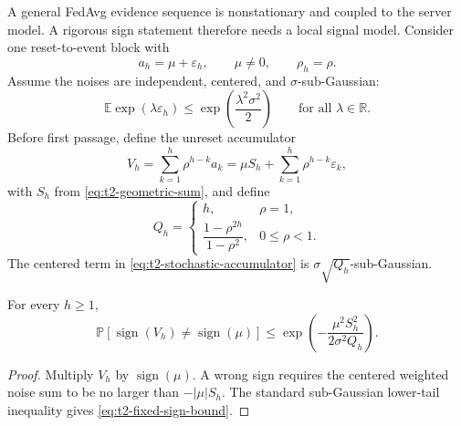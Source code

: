 A general FedAvg evidence sequence is nonstationary and coupled to the server model. A rigorous sign statement therefore needs a local signal model. Consider one reset-to-event block with
\begin{equation}
    a_h=\mu+\varepsilon_h,
    \qquad
    \mu\neq0,
    \qquad
    \rho_h=\rho.
    \label{eq:t2-signal-noise}
\end{equation}
Assume the noises are independent, centered, and $\sigma$-sub-Gaussian:
\begin{equation}
    \mathbb{E}\exp(\lambda\varepsilon_h)
    \leq
    \exp\left(\frac{\lambda^2\sigma^2}{2}\right)
    \qquad
    \text{for all }\lambda\in\mathbb{R}.
    \label{eq:t2-subgaussian}
\end{equation}
Before first passage, define the unreset accumulator
\begin{equation}
    V_h
    =
    \sum_{k=1}^{h}\rho^{h-k}a_k
    =
    \mu S_h+
    \sum_{k=1}^{h}\rho^{h-k}\varepsilon_k,
    \label{eq:t2-stochastic-accumulator}
\end{equation}
with $S_h$ from \eqref{eq:t2-geometric-sum}, and define
\begin{equation}
    Q_h=
    \begin{cases}
        h, & \rho=1,\\[1mm]
        \dfrac{1-\rho^{2h}}{1-\rho^2}, & 0\leq\rho<1.
    \end{cases}
    \label{eq:t2-noise-energy}
\end{equation}
The centered term in \eqref{eq:t2-stochastic-accumulator} is $\sigma\sqrt{Q_h}$-sub-Gaussian.

\begin{lemma}
\label{lem:t2-fixed-sign}
For every $h\geq1$,
\begin{equation}
    \mathbb{P}
    \left[
        \operatorname{sign}(V_h)
        \neq
        \operatorname{sign}(\mu)
    \right]
    \leq
    \exp\left(
        -\frac{\mu^2S_h^2}{2\sigma^2Q_h}
    \right).
    \label{eq:t2-fixed-sign-bound}
\end{equation}
\end{lemma}

\begin{proof}
Multiply $V_h$ by $\operatorname{sign}(\mu)$. A wrong sign requires the centered weighted noise sum to be no larger than $-|\mu|S_h$. The standard sub-Gaussian lower-tail inequality gives \eqref{eq:t2-fixed-sign-bound}.
\end{proof}

